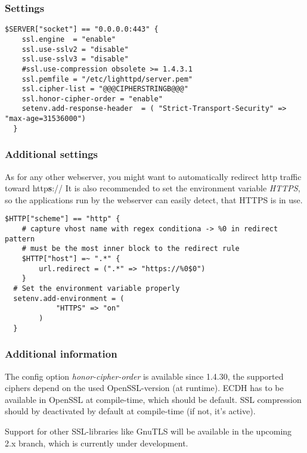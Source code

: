 \subsubsection{Settings}



\begin{lstlisting}[breaklines]
  $SERVER["socket"] == "0.0.0.0:443" {
    ssl.engine  = "enable"
    ssl.use-sslv2 = "disable"
    ssl.use-sslv3 = "disable"
    #ssl.use-compression obsolete >= 1.4.3.1
    ssl.pemfile = "/etc/lighttpd/server.pem"
    ssl.cipher-list = "@@@CIPHERSTRINGB@@@"
    ssl.honor-cipher-order = "enable"
    setenv.add-response-header  = ( "Strict-Transport-Security" => "max-age=31536000")
  }
\end{lstlisting}


\subsubsection{Additional settings}

As for any other webserver, you might want to automatically redirect http
traffic toward http\textbf{s}:// It is also recommended to set the environment variable
\emph{HTTPS}, so the applications run by the webserver can easily detect, that
HTTPS is in use.



\begin{lstlisting}[breaklines]
  $HTTP["scheme"] == "http" {
    # capture vhost name with regex conditiona -> %0 in redirect pattern
    # must be the most inner block to the redirect rule
    $HTTP["host"] =~ ".*" {
        url.redirect = (".*" => "https://%0$0")
    }
  # Set the environment variable properly
  setenv.add-environment = (
            "HTTPS" => "on"
        )
  }
\end{lstlisting}


\subsubsection{Additional information} 
The config option \emph{honor-cipher-order} is available since 1.4.30, the
supported ciphers depend on the used OpenSSL-version (at runtime). ECDH has to
be available in OpenSSL at compile-time, which should be default. SSL
compression should by deactivated by default at compile-time (if not, it's
active).

Support for other SSL-libraries like GnuTLS will be available in the upcoming
2.x branch, which is currently under development.



